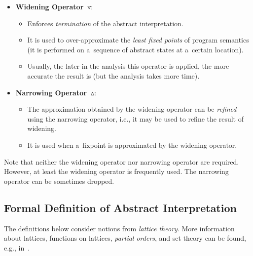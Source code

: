 \begin{samepage}
\begin{itemize}
    \item \textbf{Widening Operator~$ \boldsymbol{\triangledown} $}:
        \begin{itemize}
            \item Enforces \emph{termination} of the abstract interpretation.

            \item It is used to over-approximate the \emph{least fixed points} of program semantics (it is performed on a~sequence of abstract states at a~certain location).

            \item Usually, the later in the analysis this operator is applied, the more accurate the result is (but the analysis takes more time).
        \end{itemize}

    \item \textbf{Narrowing Operator~$ \boldsymbol{\vartriangle} $}:
        \begin{itemize}
            \item The approximation obtained by the widening operator can be \emph{refined} using the narrowing operator, i.e., it may be used to refine the result of widening.

            \item It is used when a~fixpoint is approximated by the widening operator.
        \end{itemize}
\end{itemize}
\end{samepage}
Note that neither the widening operator nor narrowing operator are required. However, at least the widening operator is frequently used. The narrowing operator can be sometimes dropped.

\subsection{Formal Definition of Abstract Interpretation}

The definitions below consider notions from \emph{lattice theory}. More information about lattices, functions on lattices, \emph{partial orders}, and set theory can be found, e.g., in~\cite{staticAnalysisMoller, programAnalysisNielson, staticAnalysisRival}.

